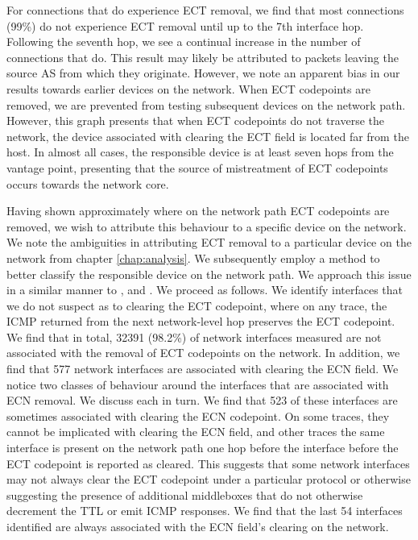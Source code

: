 \documentclass{l4proj}
\begin{document}
For connections that do experience ECT removal, we find that most connections (99\%) do not experience ECT removal until up to the 7th interface hop. Following the seventh hop, we see a continual increase in the number of connections that do. This result may likely be attributed to packets leaving the source AS from which they originate. However, we note an apparent bias in our results towards earlier devices on the network. When ECT codepoints are removed, we are prevented from testing subsequent devices on the network path. However, this graph presents that when ECT codepoints do not traverse the network, the device associated with clearing the ECT field is located far from the host. In almost all cases, the responsible device is at least seven hops from the vantage point, presenting that the source of mistreatment of ECT codepoints occurs towards the network core.

Having shown approximately where on the network path ECT codepoints are removed, we wish to attribute this behaviour to a specific device on the network. We note the ambiguities in attributing ECT removal to a particular device on the network from chapter \ref{chap:analysis}. We subsequently employ a method to better classify the responsible device on the network path. We approach this issue in a similar manner to \cite{mcquistin_is_2015}, and \cite{bauer_measuring_2011}. We proceed as follows. We identify interfaces that we do not suspect as to clearing the ECT codepoint, where on any trace, the ICMP returned from the next network-level hop preserves the ECT codepoint. We find that in total, 32391 (98.2\%) of network interfaces measured are not associated with the removal of ECT codepoints on the network. In addition, we find that 577 network interfaces are associated with clearing the ECN field. We notice two classes of behaviour around the interfaces that are associated with ECN removal. We discuss each in turn. We find that 523 of these interfaces are sometimes associated with clearing the ECN codepoint. On some traces, they cannot be implicated with clearing the ECN field, and other traces the same interface is present on the network path one hop before the interface before the ECT codepoint is reported as cleared. This suggests that some network interfaces may not always clear the ECT codepoint under a particular protocol or otherwise suggesting the presence of additional middleboxes that do not otherwise decrement the TTL or emit ICMP responses. We find that the last 54 interfaces identified are always associated with the ECN field's clearing on the network.
\end{document}
